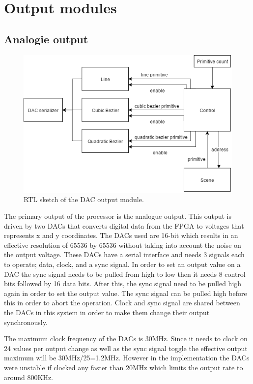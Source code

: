 \chapter{Output modules}
\label{chap:Output}

\section{Analogie output}

\begin{figure}[h!]
    \includegraphics[width=\linewidth]{images/dac-output.png}
    \caption{RTL sketch of the \vthreek DAC output module.}
    \label{fig:dac-output}
\end{figure}

The primary output of the processor is the analogue output.
This output is driven by two DACs that converts digital data from the FPGA to voltages that represents x and y coordinates.
The DACs used are 16-bit which results in an effective resolution of 65536 by 65536 without taking into account the noise on the output voltage.
These DACs have a serial interface and needs 3 signals each to operate; data, clock, and a sync signal.
In order to set an output value on a DAC the sync signal needs to be pulled from high to low then it needs 8 control bits followed by 16 data bits.
After this, the sync signal need to be pulled high again in order to set the output value.
The sync signal can be pulled high before this in order to abort the operation.
Clock and sync signal are shared between the DACs in this system in order to make them change their output synchronously.

The maximum clock frequency of the DACs is 30MHz. 
Since it needs to clock on 24 values per output change as well as the sync signal toggle the effective output maximum will be 30MHz/25=1.2MHz.
However in the implementation the DACs were unstable if clocked any faster than 20MHz which limits the output rate to around 800KHz.

